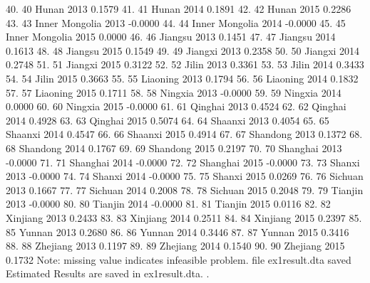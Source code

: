40. {\VBAR}  40            Hunan   2013    0.1579 {\VBAR}
41. {\VBAR}  41            Hunan   2014    0.1891 {\VBAR}
42. {\VBAR}  42            Hunan   2015    0.2286 {\VBAR}
43. {\VBAR}  43   Inner Mongolia   2013   -0.0000 {\VBAR}
44. {\VBAR}  44   Inner Mongolia   2014   -0.0000 {\VBAR}
45. {\VBAR}  45   Inner Mongolia   2015    0.0000 {\VBAR}
46. {\VBAR}  46          Jiangsu   2013    0.1451 {\VBAR}
47. {\VBAR}  47          Jiangsu   2014    0.1613 {\VBAR}
48. {\VBAR}  48          Jiangsu   2015    0.1549 {\VBAR}
49. {\VBAR}  49          Jiangxi   2013    0.2358 {\VBAR}
50. {\VBAR}  50          Jiangxi   2014    0.2748 {\VBAR}
51. {\VBAR}  51          Jiangxi   2015    0.3122 {\VBAR}
52. {\VBAR}  52            Jilin   2013    0.3361 {\VBAR}
53. {\VBAR}  53            Jilin   2014    0.3433 {\VBAR}
54. {\VBAR}  54            Jilin   2015    0.3663 {\VBAR}
55. {\VBAR}  55         Liaoning   2013    0.1794 {\VBAR}
56. {\VBAR}  56         Liaoning   2014    0.1832 {\VBAR}
57. {\VBAR}  57         Liaoning   2015    0.1711 {\VBAR}
58. {\VBAR}  58          Ningxia   2013   -0.0000 {\VBAR}
59. {\VBAR}  59          Ningxia   2014    0.0000 {\VBAR}
60. {\VBAR}  60          Ningxia   2015   -0.0000 {\VBAR}
61. {\VBAR}  61          Qinghai   2013    0.4524 {\VBAR}
62. {\VBAR}  62          Qinghai   2014    0.4928 {\VBAR}
63. {\VBAR}  63          Qinghai   2015    0.5074 {\VBAR}
64. {\VBAR}  64          Shaanxi   2013    0.4054 {\VBAR}
65. {\VBAR}  65          Shaanxi   2014    0.4547 {\VBAR}
66. {\VBAR}  66          Shaanxi   2015    0.4914 {\VBAR}
67. {\VBAR}  67         Shandong   2013    0.1372 {\VBAR}
68. {\VBAR}  68         Shandong   2014    0.1767 {\VBAR}
69. {\VBAR}  69         Shandong   2015    0.2197 {\VBAR}
70. {\VBAR}  70         Shanghai   2013   -0.0000 {\VBAR}
71. {\VBAR}  71         Shanghai   2014   -0.0000 {\VBAR}
72. {\VBAR}  72         Shanghai   2015   -0.0000 {\VBAR}
73. {\VBAR}  73           Shanxi   2013   -0.0000 {\VBAR}
74. {\VBAR}  74           Shanxi   2014   -0.0000 {\VBAR}
75. {\VBAR}  75           Shanxi   2015    0.0269 {\VBAR}
76. {\VBAR}  76          Sichuan   2013    0.1667 {\VBAR}
77. {\VBAR}  77          Sichuan   2014    0.2008 {\VBAR}
78. {\VBAR}  78          Sichuan   2015    0.2048 {\VBAR}
79. {\VBAR}  79          Tianjin   2013   -0.0000 {\VBAR}
80. {\VBAR}  80          Tianjin   2014   -0.0000 {\VBAR}
81. {\VBAR}  81          Tianjin   2015    0.0116 {\VBAR}
82. {\VBAR}  82         Xinjiang   2013    0.2433 {\VBAR}
83. {\VBAR}  83         Xinjiang   2014    0.2511 {\VBAR}
84. {\VBAR}  84         Xinjiang   2015    0.2397 {\VBAR}
85. {\VBAR}  85           Yunnan   2013    0.2680 {\VBAR}
86. {\VBAR}  86           Yunnan   2014    0.3446 {\VBAR}
87. {\VBAR}  87           Yunnan   2015    0.3416 {\VBAR}
88. {\VBAR}  88         Zhejiang   2013    0.1197 {\VBAR}
89. {\VBAR}  89         Zhejiang   2014    0.1540 {\VBAR}
90. {\VBAR}  90         Zhejiang   2015    0.1732 {\VBAR}
{\BLC}
Note: missing value indicates infeasible problem.
file ex1result.dta saved
{\smallskip}
Estimated Results are saved in ex1result.dta.
{\smallskip}
. 

